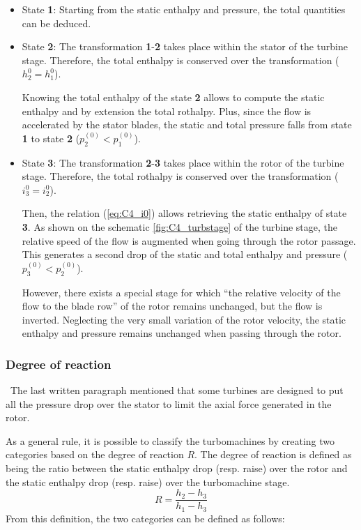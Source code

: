 \begin{itemize}
    \item State \textbf{1}: Starting from the static enthalpy and pressure, the total quantities can be deduced.
    \item State \textbf{2}: The transformation \textbf{1}-\textbf{2} takes place within the stator of the turbine stage. Therefore, the total enthalpy is conserved over the transformation ($h_2^0=h_1^0$).

    Knowing the total enthalpy of the state \textbf{2} allows to compute the static enthalpy and by extension the total rothalpy. Plus, since the flow is accelerated by the stator blades, the static and total pressure falls from state \textbf{1} to state \textbf{2} (\(p_2^{(0)}<p_1^{(0)}\)).
    \item State \textbf{3}: The transformation \textbf{2}-\textbf{3} takes place within the rotor of the turbine stage. Therefore, the total rothalpy is conserved over the transformation (\(i_3^0=i_2^0\)).

    Then, the relation (\ref{eq:C4_i0}) allows retrieving the static enthalpy of state \textbf{3}. As shown on the schematic \ref{fig:C4_turbstage} of the turbine stage, the relative speed of the flow is augmented when going through the rotor passage. This generates a second drop of the static and total enthalpy and pressure (\(p_3^{(0)}<p_2^{(0)}\)).

    However, there exists a special stage for which “the relative velocity of the flow to the blade row” of the rotor\cite{Hillewaert2019} remains unchanged, but the flow is inverted. Neglecting the very small variation of the rotor velocity, the static enthalpy and pressure remains unchanged when passing through the rotor.
\end{itemize}




\subsubsection{Degree of reaction}
\quad\ The last written paragraph mentioned that some turbines are designed to put all the pressure drop over the stator to limit the axial force generated in the rotor.

As a general rule, it is possible to classify the turbomachines by creating two categories based on the degree of reaction \(R\). The degree of reaction is defined as being the ratio between the static enthalpy drop (resp. raise) over the rotor and the static enthalpy drop (resp. raise) over the turbomachine stage.
\begin{equation}
    R = \frac{h_2 - h_3}{h_1 - h_3}\label{eq:C4_R}
\end{equation}
From this definition, the two categories can be defined as follows:

